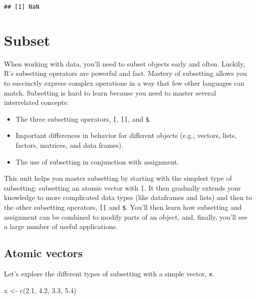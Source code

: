 \documentclass[
]{book}
\newenvironment{Shaded}{\begin{snugshade}}{\end{snugshade}}
\newcommand{\FloatTok}[1]{\textcolor[rgb]{0.00,0.00,0.81}{#1}}
\newcommand{\FunctionTok}[1]{\textcolor[rgb]{0.00,0.00,0.00}{#1}}
\newcommand{\NormalTok}[1]{#1}
\newcommand{\OtherTok}[1]{\textcolor[rgb]{0.56,0.35,0.01}{#1}}
\begin{document}
\begin{verbatim}
## [1] NaN
\end{verbatim}

\hypertarget{subset}{%
\section{Subset}\label{subset}}

When working with data, you'll need to subset objects early and often. Luckily, R's subsetting operators are powerful and fast. Mastery of subsetting allows you to succinctly express complex operations in a way that few other languages can match. Subsetting is hard to learn because you need to master several interrelated concepts:

\begin{itemize}
\item
  The three subsetting operators, \texttt{{[}}, \texttt{{[}{[}}, and \texttt{\$}.
\item
  Important differences in behavior for different objects (e.g., vectors, lists, factors, matrices, and data frames).
\item
  The use of subsetting in conjunction with assignment.
\end{itemize}

This unit helps you master subsetting by starting with the simplest type of subsetting: subsetting an atomic vector with \texttt{{[}}. It then gradually extends your knowledge to more complicated data types (like dataframes and lists) and then to the other subsetting operators, \texttt{{[}{[}} and \texttt{\$}. You'll then learn how subsetting and assignment can be combined to modify parts of an object, and, finally, you'll see a large number of useful applications.

\hypertarget{atomic-vectors}{%
\subsection{Atomic vectors}\label{atomic-vectors}}

Let's explore the different types of subsetting with a simple vector, \texttt{x}.

\begin{Shaded}
\begin{Highlighting}[]
\NormalTok{x }\OtherTok{\textless{}{-}} \FunctionTok{c}\NormalTok{(}\FloatTok{2.1}\NormalTok{, }\FloatTok{4.2}\NormalTok{, }\FloatTok{3.3}\NormalTok{, }\FloatTok{5.4}\NormalTok{)}
\end{Highlighting}
\end{Shaded}
\end{document}
